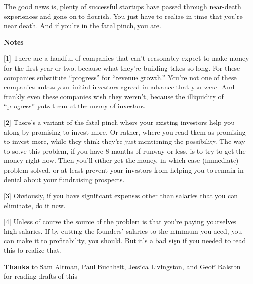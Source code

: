 The good news is, plenty of successful startups have passed through
near-death experiences and gone on to flourish. You just have to realize
in time that you're near death. And if you're in the fatal pinch, you
are.

\textbf{Notes}

{[}1{]} There are a handful of companies that can't reasonably expect to
make money for the first year or two, because what they're building
takes so long. For these companies substitute ``progress'' for ``revenue
growth.'' You're not one of these companies unless your initial
investors agreed in advance that you were. And frankly even these
companies wish they weren't, because the illiquidity of ``progress''
puts them at the mercy of investors.

{[}2{]} There's a variant of the fatal pinch where your existing
investors help you along by promising to invest more. Or rather, where
you read them as promising to invest more, while they think they're just
mentioning the possibility. The way to solve this problem, if you have 8
months of runway or less, is to try to get the money right now. Then
you'll either get the money, in which case (immediate) problem solved,
or at least prevent your investors from helping you to remain in denial
about your fundraising prospects.

{[}3{]} Obviously, if you have significant expenses other than salaries
that you can eliminate, do it now.

{[}4{]} Unless of course the source of the problem is that you're paying
yourselves high salaries. If by cutting the founders' salaries to the
minimum you need, you can make it to profitability, you should. But it's
a bad sign if you needed to read this to realize that.

\textbf{Thanks} to Sam Altman, Paul Buchheit, Jessica Livingston, and
Geoff Ralston for reading drafts of this.
